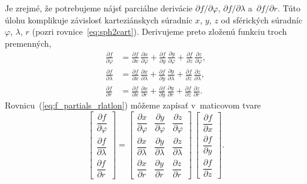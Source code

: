 \documentclass[a4paper, 12pt]{book}
\begin{document}
Je zrejmé, že potrebujeme nájsť parciálne derivácie $\partial f \slash \partial 
\varphi$, $\partial f \slash \partial \lambda$ a~$\partial f \slash \partial 
r$.  Túto úlohu komplikuje závislosť karteziánskych súradníc $x$, $y$, $z$ od 
sférických súradníc $\varphi$, $\lambda$, $r$ (pozri 
rovnice~\ref{eq:sph2cart}).  Derivujeme preto zloženú funkciu troch premenných,
%
\begin{equation}
\label{eq:f_partials_rlatlon}
\begin{split}
\frac{\partial f}{\partial \varphi} &= \frac{\partial f}{\partial x} \, 
\frac{\partial x}{\partial \varphi} + \frac{\partial f}{\partial y} \, 
\frac{\partial y}{\partial \varphi} + \frac{\partial f}{\partial z} \, 
\frac{\partial z}{\partial \varphi}{,}\\[2ex]
%
\frac{\partial f}{\partial \lambda} &= \frac{\partial f}{\partial x} \, 
\frac{\partial x}{\partial \lambda} + \frac{\partial f}{\partial y} \, 
\frac{\partial y}{\partial \lambda} + \frac{\partial f}{\partial z} \, 
\frac{\partial z}{\partial \lambda}{,}\\[2ex]
%
\frac{\partial f}{\partial r} &= \frac{\partial f}{\partial x} \, 
\frac{\partial x}{\partial r} + \frac{\partial f}{\partial y} \, \frac{\partial 
y}{\partial r} + \frac{\partial f}{\partial z} \, \frac{\partial z}{\partial 
r}{.}
\end{split}
\end{equation}
%
Rovnicu~(\ref{eq:f_partials_rlatlon}) môžeme zapísať v~maticovom tvare
%
\begin{equation}
\label{eq:f_partials_rlatlon_2}
\begin{bmatrix}
\dfrac{\partial f}{\partial \varphi}\\[2ex]
\dfrac{\partial f}{\partial \lambda}\\[2ex]
\dfrac{\partial f}{\partial r}
\end{bmatrix}
%
=
%
\begin{bmatrix}
\dfrac{\partial x}{\partial \varphi} & \dfrac{\partial y}{\partial \varphi} 
& \dfrac{\partial z}{\partial \varphi}\\[2ex]
\dfrac{\partial x}{\partial \lambda} & \dfrac{\partial y}{\partial \lambda
} & \dfrac{\partial z}{\partial \lambda}\\[2ex]
\dfrac{\partial x}{\partial r} & \dfrac{\partial y}{\partial r} 
& \dfrac{\partial z}{\partial r}
\end{bmatrix}
%
\,
%
\begin{bmatrix}
\dfrac{\partial f}{\partial x}\\[2ex]
\dfrac{\partial f}{\partial y}\\[2ex]
\dfrac{\partial f}{\partial z}
\end{bmatrix}
%
{.}
\end{equation}
\end{document}
